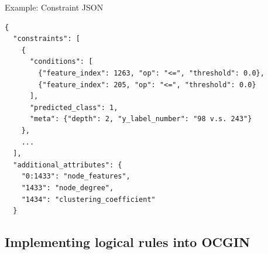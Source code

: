 \documentclass[aspectratio=169]{beamer}
\begin{document}
\begin{frame}[fragile]{Example: Constraint JSON}
    \begin{small}
    \begin{verbatim}
{
  "constraints": [
    {
      "conditions": [
        {"feature_index": 1263, "op": "<=", "threshold": 0.0},
        {"feature_index": 205, "op": "<=", "threshold": 0.0}
      ],
      "predicted_class": 1,
      "meta": {"depth": 2, "y_label_number": "98 v.s. 243"}
    },
    ...
  ],
  "additional_attributes": {
    "0:1433": "node_features",
    "1433": "node_degree",
    "1434": "clustering_coefficient"
  }

    \end{verbatim}
    \end{small}
\end{frame}

\subsection{Implementing logical rules into OCGIN}
\end{document}
